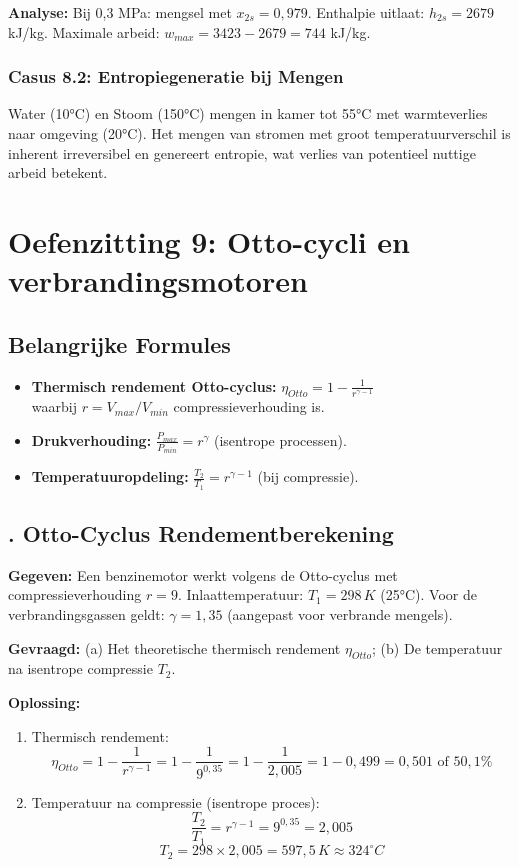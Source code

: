 \documentclass[a4paper,11pt,twoside]{report}
\newcounter{opgave}[section]
\newcommand{\opgave}[1]{%
    \refstepcounter{opgave}%
    \subsection*{\textbf{\arabic{opgave}.} #1}%
}
\begin{document}
\textbf{Analyse:}
Bij 0,3 MPa: mengsel met $x_{2s} = 0{,}979$.
Enthalpie uitlaat: $h_{2s} = 2679$ kJ/kg.
Maximale arbeid: $w_{max} = 3423 - 2679 = 744$ kJ/kg.

\subsubsection*{Casus 8.2: Entropiegeneratie bij Mengen}
Water (10°C) en Stoom (150°C) mengen in kamer tot 55°C met warmteverlies naar omgeving (20°C). 
Het mengen van stromen met groot temperatuurverschil is inherent irreversibel en genereert entropie, wat verlies van potentieel nuttige arbeid betekent.

\section{Oefenzitting 9: Otto-cycli en verbrandingsmotoren}
\setcounter{opgave}{0}
\subsection*{Belangrijke Formules}
\begin{itemize}
    \item \textbf{Thermisch rendement Otto-cyclus:} $\eta_{Otto} = 1 - \frac{1}{r^{\gamma-1}}$ \\
    waarbij $r = V_{max}/V_{min}$ compressieverhouding is.
    \item \textbf{Drukverhouding:} $\frac{P_{max}}{P_{min}} = r^{\gamma}$ (isentrope processen).
    \item \textbf{Temperatuuropdeling:} $\frac{T_2}{T_1} = r^{\gamma-1}$ (bij compressie).
\end{itemize}

\opgave{Otto-Cyclus Rendementberekening}
\textbf{Gegeven:}
Een benzinemotor werkt volgens de Otto-cyclus met compressieverhouding $r = 9$.
Inlaattemperatuur: $T_1 = 298 \, K$ (25°C).
Voor de verbrandingsgassen geldt: $\gamma = 1,35$ (aangepast voor verbrande mengels).

\textbf{Gevraagd:}
(a) Het theoretische thermisch rendement $\eta_{Otto}$; (b) De temperatuur na isentrope compressie $T_2$.

\textbf{Oplossing:}
\begin{enumerate}
    \item Thermisch rendement:
    \[ \eta_{Otto} = 1 - \frac{1}{r^{\gamma-1}} = 1 - \frac{1}{9^{0,35}} = 1 - \frac{1}{2,005} = 1 - 0,499 = 0,501 \text{ of } 50,1\% \]
    
    \item Temperatuur na compressie (isentrope proces):
    \[ \frac{T_2}{T_1} = r^{\gamma-1} = 9^{0,35} = 2,005 \]
    \[ T_2 = 298 \times 2,005 = 597,5 \, K \approx 324^\circ C \]
\end{enumerate}
\end{document}
